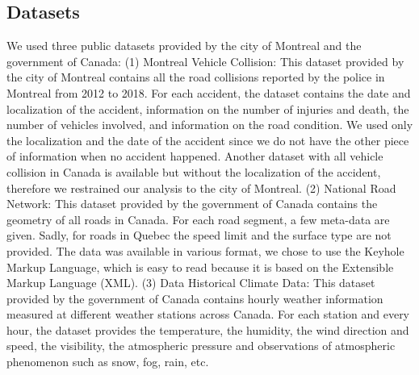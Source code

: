 \documentclass[conference]{IEEEtran}
\begin{document}
\subsection{Datasets}
We used three public datasets provided by the city of Montreal and the government of Canada: (1) Montreal Vehicle Collision: This dataset provided by the city of Montreal contains all the road collisions reported by the police in Montreal from 2012 to 2018. For each accident, the dataset contains the date and localization of the accident, information on the number of injuries and death, the number of vehicles involved, and information on the road condition. We used only the localization and the date of the accident since we do not have the other piece of information when no accident happened. Another dataset with all vehicle collision in Canada is available but without the localization of the accident, therefore we restrained our analysis to the city of Montreal. (2) National Road Network: This dataset provided by the government of Canada contains the geometry of all roads in Canada. For each road segment, a few meta-data are given. Sadly, for roads in Quebec the speed limit and the surface type are not provided. The data was available in various format, we chose to use the Keyhole Markup Language, which is easy to read because it is based on the Extensible Markup Language (XML). (3) Data Historical Climate Data: This dataset provided by the government of Canada contains hourly weather information measured at different weather stations across Canada. For each station and every hour, the dataset provides the temperature, the humidity, the wind direction and speed, the visibility, the atmospheric pressure and observations of atmospheric phenomenon such as snow, fog, rain, etc.
\end{document}
